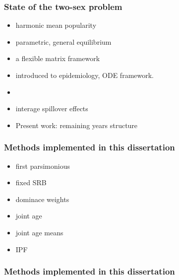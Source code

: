 \documentclass{beamer}
\begin{document}

\begin{frame}
  \frametitle{State of the two-sex problem}
  \begin{itemize}[<+->]
    \item \cite{schoen1977two, schoen1978standardized, schoen1981harmonic} 
    harmonic mean popularity
    \item \cite{marriage1981warren} parametric, general equilibrium
    \item \cite{pollak1986reformulation} a flexible matrix framework
    \item \cite{hadeler1988models, hadeler1989pair} introduced to epidemiology,
    ODE framework.
    \item \cite{billari2002wedding}
    \item \cite{choo2006estimating} interage spillover effects
    \item Present work: remaining years structure
  \end{itemize}
  
\end{frame}
\begin{frame}
  \frametitle{Methods implemented in this dissertation}
  \begin{itemize}
     \item \cite{pollard1948measurement} first parsimonious
     \item \cite{mitra1978derivation} fixed SRB
     \item \cite{goodman1967age} dominace weights
     \item \cite{gupta1978general} joint age
     \item \cite{schoen1981harmonic} joint age means
     \item \cite{mc1975models} IPF
  \end{itemize}
\end{frame}

\begin{frame}
  \frametitle{Methods implemented in this dissertation}
\end{frame}
\end{document}
